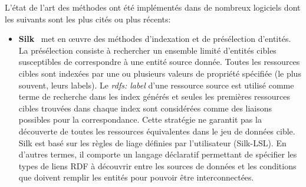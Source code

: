 L'état de l'art des méthodes ont été implémentés dans de nombreux logiciels dont les suivants sont les plus cités ou plus récents:


\begin{itemize}

\item \textbf{Silk}~\cite{Jentzsch} met en œuvre des méthodes d'indexation et de présélection d'entités. La présélection consiste à rechercher un ensemble limité d’entités cibles susceptibles de correspondre à une entité source donnée. Toutes les ressources cibles sont indexées par une ou plusieurs valeurs de propriété spécifiée (le plus souvent, leurs labels). Le \textit{rdfs: label} d'une ressource source est utilisé comme terme de recherche dans les index générés et seules les premières ressources cibles trouvées dans chaque index sont considérées comme des liaisons possibles pour la correspondance. Cette stratégie ne garantit pas la découverte de toutes les ressources équivalentes dans le jeu de données cible. Silk est basé sur les règles de liage définies par l'utilisateur (Silk-LSL). En d'autres termes, il comporte un langage déclaratif permettant de spécifier les types de liens RDF à découvrir entre les sources de données et les conditions que doivent remplir les entités pour pouvoir être interconnectées.\\


\end{itemize}
